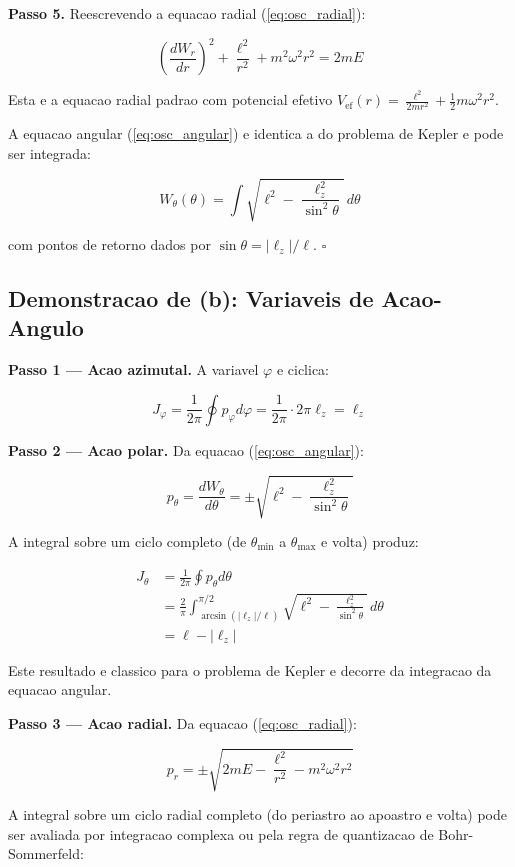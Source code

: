 \documentclass[12pt,a4paper,oneside]{article}
\begin{document}
\textbf{Passo 5.} Reescrevendo a equacao radial (\ref{eq:osc_radial}):

$$\left(\frac{dW_r}{dr}\right)^2 + \frac{\ell^2}{r^2} + m^2\omega^2r^2 = 2mE$$

Esta e a equacao radial padrao com potencial efetivo
$V_{\text{ef}}(r) = \frac{\ell^2}{2mr^2} + \frac{1}{2}m\omega^2r^2$.

A equacao angular (\ref{eq:osc_angular}) e identica a do problema de Kepler e
pode ser integrada:

$$W_\theta(\theta) = \int \sqrt{\ell^2 - \frac{\ell_z^2}{\sin^2\theta}}\,d\theta$$

com pontos de retorno dados por $\sin\theta = |\ell_z|/\ell$. $\square$

\subsection*{Demonstracao de (b): Variaveis de Acao-Angulo}

\textbf{Passo 1 — Acao azimutal.} A variavel $\varphi$ e ciclica:

$$J_\varphi = \frac{1}{2\pi}\oint p_\varphi d\varphi =
\frac{1}{2\pi} \cdot 2\pi\ell_z = \ell_z$$

\textbf{Passo 2 — Acao polar.} Da equacao (\ref{eq:osc_angular}):

$$p_\theta = \frac{dW_\theta}{d\theta} = \pm\sqrt{\ell^2 -
\frac{\ell_z^2}{\sin^2\theta}}$$

A integral sobre um ciclo completo (de $\theta_{\min}$ a $\theta_{\max}$ e
volta) produz:

\begin{align*}
J_\theta &= \frac{1}{2\pi}\oint p_\theta d\theta \\
&= \frac{2}{\pi}\int_{\arcsin(|\ell_z|/\ell)}^{\pi/2}
\sqrt{\ell^2 - \frac{\ell_z^2}{\sin^2\theta}}\,d\theta \\
&= \ell - |\ell_z|
\end{align*}

Este resultado e classico para o problema de Kepler e decorre da integracao
da equacao angular.

\textbf{Passo 3 — Acao radial.} Da equacao (\ref{eq:osc_radial}):

$$p_r = \pm\sqrt{2mE - \frac{\ell^2}{r^2} - m^2\omega^2r^2}$$

A integral sobre um ciclo radial completo (do periastro ao apoastro e volta)
pode ser avaliada por integracao complexa ou pela regra de quantizacao de
Bohr-Sommerfeld:
\end{document}
